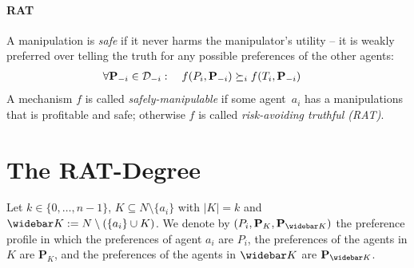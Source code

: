 \paragraph{RAT}
A manipulation is \emph{safe} if it never harms the manipulator's utility -- it is weakly preferred over telling the truth for any possible preferences of the other agents:
\begin{align}
    &\forall \mathbf{P}_{-i}\in \mathbf{\mathcal{D}}_{-i} : \quad f(P_i,\mathbf{P}_{-i}) \succeq_i f(T_i,\mathbf{P}_{-i})
\end{align}
%
%
%
%
%
A mechanism $f$ is called \emph{safely-manipulable} if some agent~$a_i$ has a manipulations that is profitable and safe; otherwise $f$ is called \emph{risk-avoiding truthful (RAT)}. 




\section{The RAT-Degree}\label{sec:RAT-degree}


\newcommand{\prefsOf}[1]{\mathbf{P}_{#1}}
\newcommand{\domainsOf}[1]{\mathbf{D}_{#1}}

Let $k \in \{0,\ldots, n-1\}$, $K \subseteq N \setminus \{a_i\}$ with $|K| = k$ and $\notK := N \setminus (\{a_i\} \cup K)$.
We denote by $(P_i, \prefsOf{K}, \prefsOf{\notK})$ the preference profile in which the preferences of agent $a_i$ are $P_i$, the preferences of the agents in $K$ are $\prefsOf{K}$, and the preferences of the agents in $\notK$ are $\prefsOf{\notK}$.


